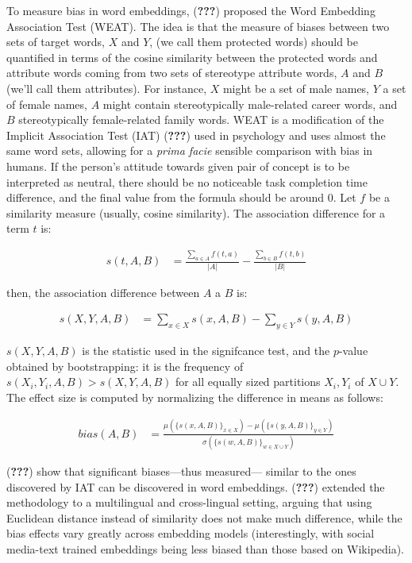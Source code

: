 \documentclass[10pt,dvipsnames,enabledeprecatedfontcommands]{scrartcl}
\begin{document}
To measure bias in word embeddings, ({\textbf{???}}) proposed the Word
Embedding Association Test (WEAT). The idea is that the measure of
biases between two sets of target words, \(X\) and \(Y\), (we call them
protected words) should be quantified in terms of the cosine similarity
between the protected words and attribute words coming from two sets of
stereotype attribute words, \(A\) and \(B\) (we'll call them
attributes). For instance, \(X\) might be a set of male names, \(Y\) a
set of female names, \(A\) might contain stereotypically male-related
career words, and \(B\) stereotypically female-related family words.
WEAT is a modification of the Implicit Association Test (IAT)
({\textbf{???}}) used in psychology and uses almost the same word sets,
allowing for a \emph{prima facie} sensible comparison with bias in
humans. If the person's attitude towards given pair of concept is to be
interpreted as neutral, there should be no noticeable task completion
time difference, and the final value from the formula should be around
0. Let \(f\) be a similarity measure (usually, cosine similarity). The
association difference for a term \(t\) is:

\begin{align}
s(t,A,B) & = \frac{\sum_{a\in A}f(t,a)}{\vert A\vert} - \frac{\sum_{b\in B}f(t,b)}{\vert B\vert}
\end{align}

\noindent then, the association difference between \(A\) a \(B\) is:

\begin{align}
s(X,Y,A,B) & = \sum_{x\in X} s(x,A,B) -  \sum_{y\in Y} s(y,A,B)
\end{align}

\noindent
\(s(X,Y,A,B)\) is the statistic used in the signifcance test, and the
\(p\)-value obtained by bootstrapping: it is the frequency of
\(s(X_i,Y_i,A,B)>s(X,Y,A,B)\) for all equally sized partitions
\(X_i, Y_i\) of \(X\cup Y\). The effect size is computed by normalizing
the difference in means as follows:

\begin{align}
bias(A,B) & = \frac{
\mu(\{s(x,A,B)\}_{x\in X}) -\mu(\{s(y,A,B)\}_{y\in Y}) 
}{
\sigma(\{s(w,A,B)\}_{w\in X\cup Y})
}
\end{align}

({\textbf{???}}) show that significant biases---thus measured--- similar
to the ones discovered by IAT can be discovered in word embeddings.
({\textbf{???}}) extended the methodology to a multilingual and
cross-lingual setting, arguing that using Euclidean distance instead of
similarity does not make much difference, while the bias effects vary
greatly across embedding models (interestingly, with social media-text
trained embeddings being less biased than those based on Wikipedia).
\end{document}
